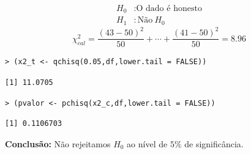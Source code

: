 \documentclass[14pt,aspectratio=1610]{beamer}
\begin{document}
\begin{frame}[fragile]{}
\frametitle{}
\begin{block}{}
\justifying
\begin{align*}
H_{0}&: \textrm{O dado é honesto} \\ 
H_{1}&: \textrm{Não}\ H_{0}
\end{align*}
$$\chi^{2}_{cal}=\dfrac{(43-50)^{2}}{50}+\cdots+\dfrac{(41-50)^{2}}{50}=8.96$$

\begin{verbatim}
> (x2_t <- qchisq(0.05,df,lower.tail = FALSE))
\end{verbatim}

\begin{verbatim}
[1] 11.0705
\end{verbatim}

\begin{verbatim}
> (pvalor <- pchisq(x2_c,df,lower.tail = FALSE))
\end{verbatim}

\begin{verbatim}
[1] 0.1106703
\end{verbatim}


{\bf Conclusão:} Não rejeitamos $H_{0}$ ao nível de $5\%$ de significância.
\end{block}
\end{frame}
\end{document}
